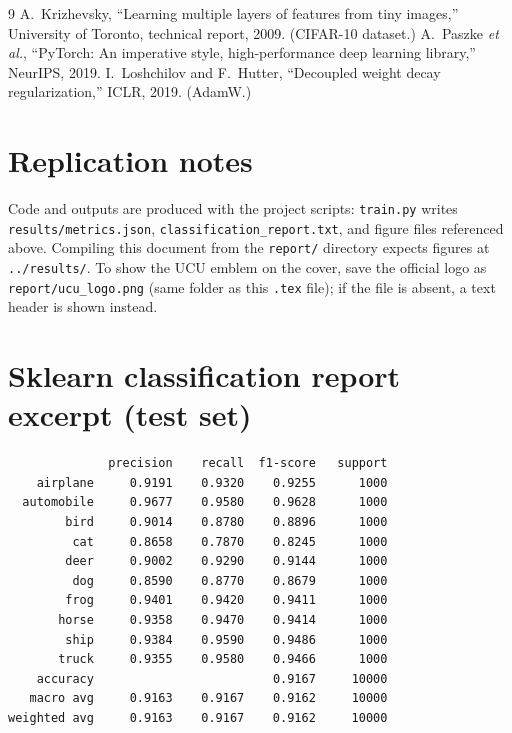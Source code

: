\documentclass[11pt,a4paper]{article}
\begin{document}
\begin{thebibliography}{9}
A.~Krizhevsky, ``Learning multiple layers of features from tiny images,'' University of Toronto, technical report, 2009. (CIFAR-10 dataset.)
A.~Paszke \emph{et al.}, ``PyTorch: An imperative style, high-performance deep learning library,'' NeurIPS, 2019.
I.~Loshchilov and F.~Hutter, ``Decoupled weight decay regularization,'' ICLR, 2019. (AdamW.)
\end{thebibliography}

\begin{appendices}
\section{Replication notes}
\label{app:rep}
Code and outputs are produced with the project scripts: \texttt{train.py} writes \texttt{results/metrics.json}, \texttt{classification\_report.txt}, and figure files referenced above. Compiling this document from the \texttt{report/} directory expects figures at \texttt{../results/}. To show the UCU emblem on the cover, save the official logo as \texttt{report/ucu\_logo.png} (same folder as this \texttt{.tex} file); if the file is absent, a text header is shown instead.

\section{Sklearn classification report excerpt (test set)}
\label{app:sk}
\small
\begin{verbatim}
              precision    recall  f1-score   support
    airplane     0.9191    0.9320    0.9255      1000
  automobile     0.9677    0.9580    0.9628      1000
        bird     0.9014    0.8780    0.8896      1000
         cat     0.8658    0.7870    0.8245      1000
        deer     0.9002    0.9290    0.9144      1000
         dog     0.8590    0.8770    0.8679      1000
        frog     0.9401    0.9420    0.9411      1000
       horse     0.9358    0.9470    0.9414      1000
        ship     0.9384    0.9590    0.9486      1000
       truck     0.9355    0.9580    0.9466      1000
    accuracy                         0.9167     10000
   macro avg     0.9163    0.9167    0.9162     10000
weighted avg     0.9163    0.9167    0.9162     10000
\end{verbatim}
\end{appendices}
\end{document}
